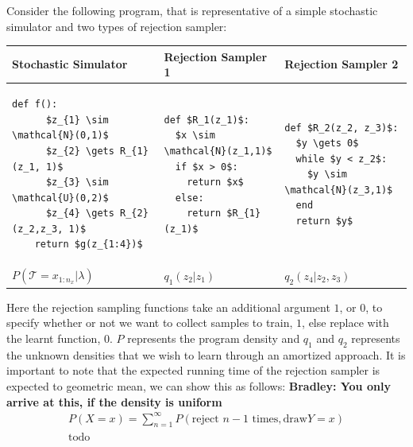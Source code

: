 \documentclass{article}
\begin{document}
Consider the following program, that is representative of a simple stochastic simulator
and two types of rejection sampler:


\noindent
\begin{tabular}{|p{3.6cm}|p{3.6cm}|p{3.6cm}|}
\hline
Stochastic Simulator  & Rejection Sampler 1 & Rejection Sampler 2 \\
\hline
\begin{lstlisting}[mathescape=true]
    def f():
      $z_{1} \sim \mathcal{N}(0,1)$
      $z_{2} \gets R_{1}(z_1, 1)$
      $z_{3} \sim \mathcal{U}(0,2)$
      $z_{4} \gets R_{2}(z_2,z_3, 1)$
    return $g(z_{1:4})$
\end{lstlisting}&
\begin{lstlisting}[mathescape=true]
def $R_1(z_1)$:
  $x \sim \mathcal{N}(z_1,1)$
  if $x > 0$:
    return $x$
  else:
    return $R_{1}(z_1)$
\end{lstlisting}&
\begin{lstlisting}[mathescape=true]
def $R_2(z_2, z_3)$:
  $y \gets 0$
  while $y < z_2$:
    $y \sim \mathcal{N}(z_3,1)$
  end
  return $y$
\end{lstlisting}\\
\hline
$P(\mathcal{T}= x_{1:n_x} | \lambda)$ & $q_{1}(z_{2} | z_{1})$ & $q_{2}(z_{4} |z_{2},z_{3})$ \\
\hline
\end{tabular} 

Here the rejection sampling functions take an additional argument $1$, or $0$,
to specify whether or not we want to collect samples to train, $1$, else replace with 
the learnt function, $0$. $P$ represents the program density and $q_{1}$ and $q_{2}$ represents 
the unknown densities that we wish to learn through an amortized approach.
It is important to note that the expected running time of the rejection sampler is expected to geometric mean, we can show this as follows:
\textbf{Bradley:  You only arrive at this, if the density is uniform}
\begin{align*}
P( X= x) = \sum^{\infty}_{n=1} P(\text{reject $n-1$ times}, \text{draw} Y = x) \\
\text{todo} 
\end{align*}
\end{document}
